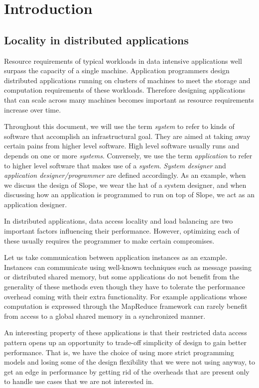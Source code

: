 \chapter{Introduction}
\label{chap:introduction}

\section{Locality in distributed applications}
Resource requirements of typical workloads in data intensive applications well surpass the
capacity of a single machine. 
Application programmers design distributed applications running on clusters of
machines to
meet the storage and computation requirements of these workloads. Therefore
designing applications that can scale across many machines becomes important as
resource requirements increase over time.


Throughout this document, we will use the term \emph{system} to refer to
kinds of software that accomplish an infrastructural goal. They are aimed at
taking away certain pains from higher level software. High level software
usually runs and depends on one or more \emph{systems}.
Conversely, we use the term \emph{application} to refer to higher level
software that makes use of a \emph{system}.
\emph{System designer} and \emph{application designer/programmer} are
defined accordingly. As an example, when we
discuss the design of Slope, we wear the hat of a system designer, and when
discussing how an application is programmed to run on top of Slope, we act as
an application designer.

In distributed applications, data access locality and load balancing
are two important factors influencing their performance. However,
optimizing each of these usually requires the programmer to make certain
compromises.

Let us take communication between application instances as an example.
Instances can communicate using well-known techniques such as message passing
or distributed shared memory, but some applications do not benefit from the
generality of these methods even though they have to tolerate the performance
overhead coming with their extra functionality. For example applications whose
computation is expressed through the MapReduce \cite{dean2008mapreduce}
framework can rarely benefit from access to a
global shared memory in a synchronized manner.

An interesting property of these applications is that their
restricted data access pattern opens up an opportunity to trade-off simplicity
of design to gain better performance. That is, we have the choice of using more
strict programming models and losing some of the design flexibility that we
were not using anyway, to get an edge in performance by getting rid of the
overheads that are present only to handle use cases that we are not interested
in.

